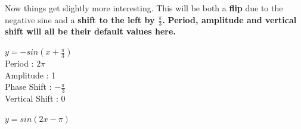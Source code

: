 \documentclass[10pt,letterpaper]{amspset}
\begin{document}
\begin{solution}[Solution]
    Now things get slightly more interesting. This will be both a \textbf{flip} due to the negative sine and a \textbf{shift to the left by $\frac{\pi}{3}$.} \textbf{Period, amplitude and vertical shift will all be their default values here.}
    \medskip 
    

    \noindent $y = -sin(x + \frac{\pi}{3})$ \\[+2mm]
    Period : $2\pi$ \\[+2mm]
    Amplitude : 1 \\[+2mm]
    Phase Shift : $-\frac{\pi}{3}$ \\[+2mm]
    Vertical Shift : 0 \\

   
\end{solution}


\pagebreak


\begin{problem}[6]
    $y = sin(2x - \pi)$
\end{problem}
\end{document}
